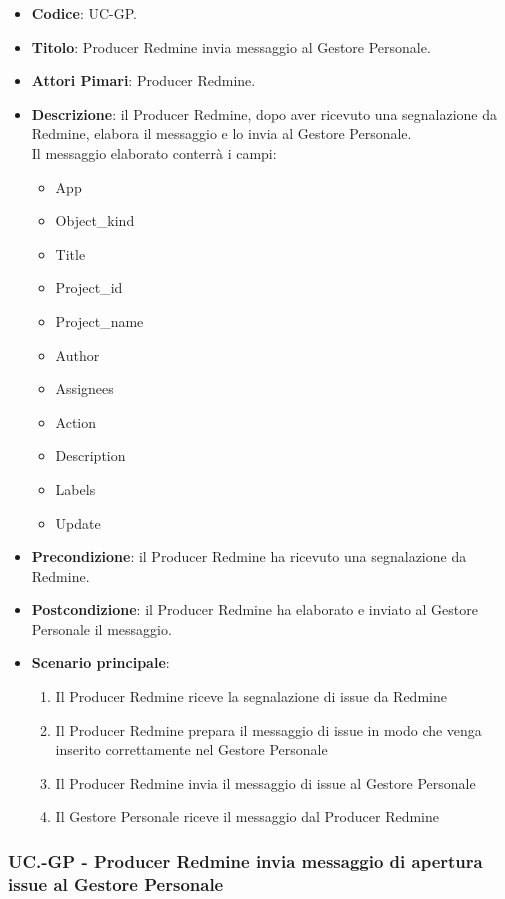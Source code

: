 	\begin{itemize}
		\item \textbf{Codice}: UC\theuccount-GP.
		\item \textbf{Titolo}: Producer Redmine invia messaggio al Gestore Personale.
		\item \textbf{Attori Pimari}: Producer Redmine.
		\item \textbf{Descrizione}: il Producer Redmine, dopo aver ricevuto una
		 segnalazione da Redmine, elabora il messaggio e lo invia al Gestore Personale.\\
		 Il messaggio elaborato conterrà i campi:
		 \begin{itemize}
		 	\item App
		 	\item Object\_kind
		 	\item Title
		 	\item Project\_id
		 	\item Project\_name
		 	\item Author
		 	\item Assignees
		 	\item Action
		 	\item Description
		 	\item Labels
		 	\item Update
		 \end{itemize}
		\item \textbf{Precondizione}: il Producer Redmine ha ricevuto una segnalazione da Redmine.
		\item \textbf{Postcondizione}: il Producer Redmine ha elaborato e inviato al Gestore Personale il messaggio.
		\item \textbf{Scenario principale}:
		\begin{enumerate}
			\item Il Producer Redmine riceve la segnalazione di issue da Redmine
			\item Il Producer Redmine prepara il messaggio di issue in modo che venga inserito correttamente nel Gestore Personale
			\item Il Producer Redmine invia il messaggio di issue al Gestore Personale
            \item Il Gestore Personale riceve il messaggio dal Producer Redmine
		\end{enumerate}

	\end{itemize}

	\subsubsection{UC\theuccount.\thesubuccount-GP - Producer Redmine invia messaggio di apertura issue al Gestore Personale}

